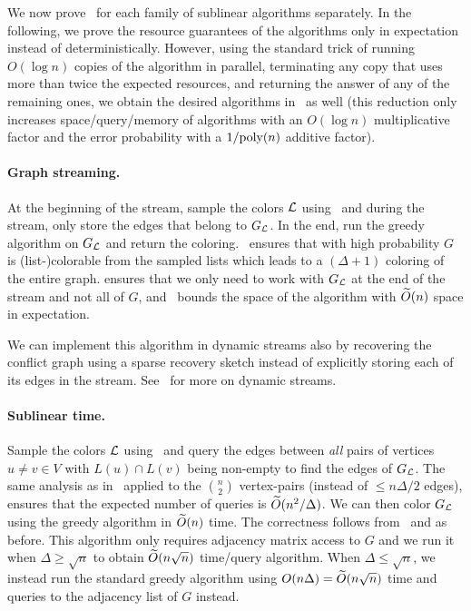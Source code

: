 We now prove~ for each family of sublinear algorithms separately. In the following, we prove the resource guarantees of the algorithms only in expectation instead of deterministically. However, using the standard trick of running $O(\log{n})$ copies of the algorithm in parallel, terminating any copy that uses more than twice the expected resources, and returning the answer of any of the remaining ones, we obtain the desired
algorithms in~ as well (this reduction only increases space/query/memory of algorithms with an $O(\log{n})$ multiplicative factor and the error probability with a $1/\mbox{\rm poly}(n)$ additive factor). 

\paragraph{Graph streaming.} At the beginning of the stream, sample the colors $\mathcal{L}$ using~ and during the stream, only store the edges that belong to $G_{\mathcal{L}}$. In the end, 
run the greedy algorithm on $G_{\mathcal{L}}$ and return the coloring.~ ensures that with high probability $G$ is (list-)colorable from the sampled lists which leads to a $(\Delta+1)$ coloring of the entire graph. 
 ensures that we only need to work with $G_{\mathcal{L}}$ at the end of the stream and not all of $G$, and~ bounds the space of the algorithm with $\widetilde{O}(n)$ space in expectation. 

We can implement this algorithm in dynamic streams also by recovering the conflict graph using a sparse recovery sketch instead of explicitly storing each of its edges in the stream. See~\cite{AhnGM12} for more on dynamic streams. 

\paragraph{Sublinear time.} Sample the colors $\mathcal{L}$ using~ and query the edges between \emph{all} pairs of vertices $u \neq v \in V$ with $L(u) \cap L(v)$ being non-empty to find the edges of $G_{\mathcal{L}}$. The same analysis as in~
applied to the ${{n}\choose{2}}$ vertex-pairs (instead of $\leq n\Delta/2$ edges), ensures that the expected number of queries is $\widetilde{O}(n^2/\Delta)$. We can then color $G_{\mathcal{L}}$ using the greedy algorithm in $\widetilde{O}(n)$ time. The correctness follows 
from~ and  as before. This algorithm only requires adjacency matrix access to $G$ and we run it when $\Delta \geq \sqrt{n}$ to obtain $\widetilde{O}(n\sqrt{n})$ time/query algorithm. When $\Delta \leq \sqrt{n}$, we instead run the standard greedy algorithm using $O(n\Delta) = \widetilde{O}(n\sqrt{n})$ 
time and queries to the adjacency list of $G$ instead. 

